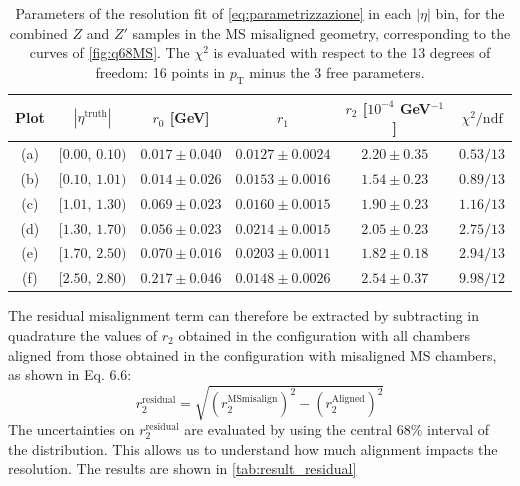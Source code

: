 \documentclass[11pt,a4paper,twoside,openright]{report}
\begin{document}
\begin{table}[htbp]
    \centering
    \begin{tabular}{c c c c c c}
        \toprule
        Plot & $|\eta^{\mathrm{truth}}|$ & $r_0$ [GeV] & $r_1$ & $r_2$ [$10^{-4}$ GeV$^{-1}$] & $\chi^2/\mathrm{ndf}$ \\
        \midrule
        (a) & $[0.00,\,0.10)$ & $0.017 \pm 0.040$ & $0.0127 \pm 0.0024$ & $2.20 \pm 0.35$ & $0.53/13$ \\
        (b) & $[0.10,\,1.01)$ & $0.014 \pm 0.026$ & $0.0153 \pm 0.0016$ & $1.54 \pm 0.23$ & $0.89/13$ \\
        (c) & $[1.01,\,1.30)$ & $0.069 \pm 0.023$ & $0.0160 \pm 0.0015$ & $1.90 \pm 0.23$ & $1.16/13$ \\
        (d) & $[1.30,\,1.70)$ & $0.056 \pm 0.023$ & $0.0214 \pm 0.0015$ & $2.05 \pm 0.23$ & $2.75/13$ \\
        (e) & $[1.70,\,2.50)$ & $0.070 \pm 0.016$ & $0.0203 \pm 0.0011$ & $1.82 \pm 0.18$ & $2.94/13$ \\
        (f) & $[2.50,\,2.80)$ & $0.217 \pm 0.046$ & $0.0148 \pm 0.0026$ & $2.54 \pm 0.37$ & $9.98/12$ \\
        \bottomrule
    \end{tabular}
    \caption{Parameters of the resolution fit of \cref{eq:parametrizzazione} in each $|\eta|$ bin, for the combined $Z$ and $Z'$ samples in the MS misaligned geometry, corresponding to the curves of \cref{fig:q68MS}. The $\chi^2$ is evaluated with respect to the 13 degrees of freedom: 16 points in $p_{\mathrm{T}}$ minus the 3 free parameters.}
    \label{tab:risultati_fit_disall}
\end{table}
\noindent The residual misalignment term can therefore be extracted by subtracting in quadrature the values of $r_2$ obtained in the configuration with all chambers aligned from those obtained in the configuration with misaligned MS chambers, as shown in Eq. 6.6:
%
\begin{equation}
  r_2^{\mathrm{residual}} = \sqrt{\left(r_2^{\mathrm{MSmisalign}}\right)^2 -
  \left(r_2^{\mathrm{Aligned}}\right)^2}
  \label{eq:residui-disallineamento}
\end{equation}
%
%
The uncertainties on $r_2^{\mathrm{residual}}$ are evaluated by using the central $68\%$ interval of the distribution. This allows us to understand how much alignment impacts the resolution. The results are shown in \cref{tab:result_residual}
\end{document}
